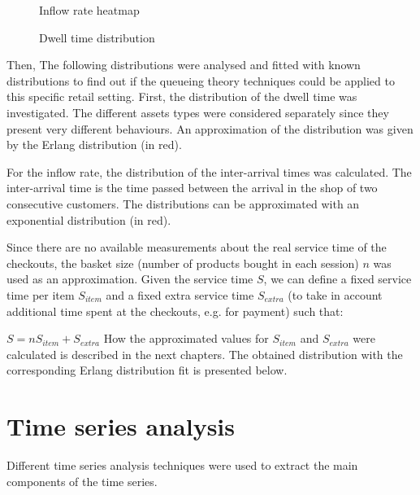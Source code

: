 \begin{figure}
  \begin{center}
  \end{center}
  \caption{Inflow rate heatmap}
\end{figure}

\begin{figure}
  \begin{center}
  \end{center}
  \caption{Dwell time distribution}
\end{figure}

Then, The following distributions were analysed and fitted with known distributions to find out if the queueing theory techniques could be applied to this specific retail setting.
First, the distribution of the dwell time was investigated. The different assets types were considered separately since they present very different behaviours. An approximation of the distribution was given by the Erlang distribution (in red).

For the inflow rate, the distribution of the inter-arrival times was calculated. The inter-arrival time is the time passed between the arrival in the shop of two consecutive customers. The distributions can be approximated with an exponential distribution (in red).

Since there are no available measurements about the real service time of the checkouts, the basket size (number of products bought in each session) $ n $ was used as an approximation. Given the service time $ S $, we can define a fixed service time per item $ S_{item} $ and a fixed extra service time $ S_{extra} $ (to take in account additional time spent at the checkouts, e.g. for payment) such that:

$ S = n S_{item} + S_{extra} $
How the approximated values for $ S_{item} $ and $ S_{extra} $ were calculated is described in the next chapters.
The obtained distribution with the corresponding Erlang distribution fit is presented below.


\section{Time series analysis}
\label{sec:time_series_analysis}
Different time series analysis techniques were used to extract the main components of the time series.

